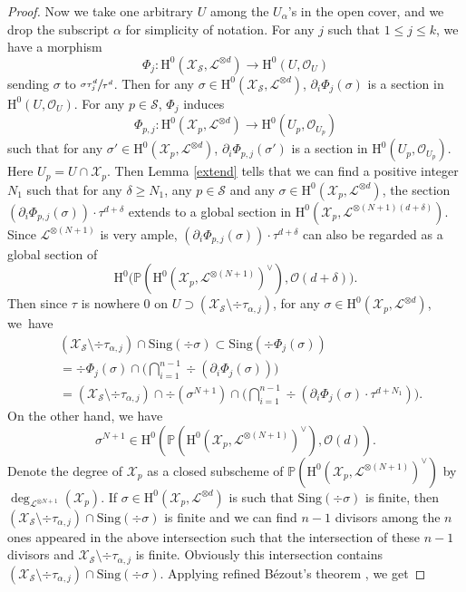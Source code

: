 \documentclass[11pt]{article}
\numberwithin{equation}{section}
\theoremstyle{plain}
\theoremstyle{definition}
\newcommand{\ho}{\mathrm{H}}
\newcommand{\X}{\mathcal{X}}
\newcommand{\li}{\mathcal{L}}
\newcommand{\pr}{\mathbb{P}}
\begin{document}
\begin{proof}
Now we take one arbitrary $U$ among the $U_{\alpha}$'s in the open cover, and we drop the subscript $\alpha$ for simplicity of notation. For any $j$ such that $1\leq j\leq k$, we have a morphism
\[
\Phi_{j}: \ho^0(\X_{\mathcal{S}}, \li^{\otimes d}) \to \ho^0(U,\mathcal{O}_{U})
\]
sending $\sigma$ to $\sfrac{\sigma\tau_{j}^{d}}{\tau^{d}}$. Then for any $\sigma\in \ho^0(\X_{\mathcal{S}}, \li^{\otimes d})$, $\partial_{i}\Phi_{j}(\sigma)$ is a section in $\ho^0(U,\mathcal{O}_{U})$. For any $p\in \mathcal{S}$, $\Phi_{j}$ induces
\[
\Phi_{p,j}: \ho^0(\X_{p}, \li^{\otimes d}) \to \ho^0(U_p,\mathcal{O}_{U_p})
\] such that for any $\sigma'\in \ho^0(\X_{p}, \li^{\otimes d})$, $\partial_{i}\Phi_{p,j}(\sigma')$ is a section in $\ho^0(U_p,\mathcal{O}_{U_p})$. Here $U_p=U\cap \X_p$. Then Lemma \ref{extend} tells that we can find a positive integer $N_1$ such that for any $\delta\geq N_1$, any $p\in \mathcal{S}$ and any $\sigma\in \ho^0(\X_{p}, \li^{\otimes d})$, the section $\left(\partial_i \Phi_{p,j}(\sigma) \right)\cdot \tau^{d+\delta}$ extends to a global section in $\ho^0(\X_p, \li^{\otimes (N+1)(d+\delta)})$. Since $\li^{\otimes (N+1)}$ is very ample, $\left(\partial_i \Phi_{p,j}(\sigma) \right)\cdot \tau^{d+\delta}$ can also be regarded as a global section of
\[
\ho^0\bigl(\pr(\ho^0(\X_{p}, \li^{\otimes (N+1)})^{\vee}), \mathcal{O}(d+\delta)\bigr).
\]
Then since $\tau$ is nowhere $0$ on $U\supset \left(\X_{\mathcal{S}}\setminus \div \tau_{\alpha,j}\right)$, for any $\sigma\in \ho^0(\X_{p}, \li^{\otimes d})$, we~have
\begin{align*}
&\left(\X_{\mathcal{S}}\setminus \div \tau_{\alpha,j}\right)\cap \mathrm{Sing}(\div \sigma)\subset \mathrm{Sing}(\div \Phi_j(\sigma)) \\
&=\div \Phi_j(\sigma)\cap \biggl(\bigcap_{i=1}^{n-1}\div \left(\partial_i \Phi_j(\sigma) \right)\biggr) \\
&= \left(\X_{\mathcal{S}}\setminus \div \tau_{\alpha,j}\right)\cap \div (\sigma^{N+1})\cap \biggl(\bigcap_{i=1}^{n-1}\div \left(\partial_i \Phi_j(\sigma) \cdot \tau^{d+N_1} \right)\biggr).
\end{align*}
On the other hand, we have
\[
\sigma^{N+1}\in \ho^0(\pr(\ho^0(\X_p, \li^{\otimes (N+1)})^{\vee}), \mathcal{O}(d)).
\]
Denote the degree of $\X_p$ as a closed subscheme of $\pr(\ho^0(\X_p, \li^{\otimes (N+1)})^{\vee})$ by $\deg_{\li^{\otimes N+1}}(\X_p)$. If $\sigma\in \ho^0(\X_{p}, \li^{\otimes d})$ is such that $\mathrm{Sing}(\div \sigma)$ is finite, then $\left(\X_{\mathcal{S}}\setminus \div \tau_{\alpha,j}\right)\cap \mathrm{Sing}(\div \sigma)$ is finite and we can find $n-1$ divisors among the $n$ ones appeared in the above intersection such that the intersection of these $n-1$ divisors and $ \X_{\mathcal{S}}\setminus \div \tau_{\alpha,j}$ is finite. Obviously this intersection contains $\left(\X_{\mathcal{S}}\setminus \div \tau_{\alpha,j}\right)\cap \mathrm{Sing}(\div \sigma)$. Applying refined Bézout's theorem \cite[Th.\,12.3]{Fu84}, we get

\end{proof}
\end{document}
